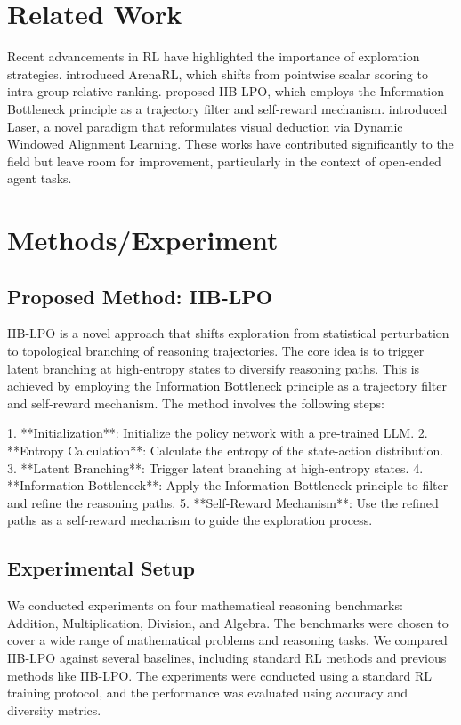 \documentclass{article}
\begin{document}
\section{Related Work}
Recent advancements in RL have highlighted the importance of exploration strategies. \cite{zhang2026arenarlscalingrlopenended} introduced ArenaRL, which shifts from pointwise scalar scoring to intra-group relative ranking. \cite{deng2026iiblpolatentpolicyoptimization} proposed IIB-LPO, which employs the Information Bottleneck principle as a trajectory filter and self-reward mechanism. \cite{wang2026foresttreeslatentsuperposition} introduced Laser, a novel paradigm that reformulates visual deduction via Dynamic Windowed Alignment Learning. These works have contributed significantly to the field but leave room for improvement, particularly in the context of open-ended agent tasks.

\section{Methods/Experiment}
\subsection{Proposed Method: IIB-LPO}
IIB-LPO is a novel approach that shifts exploration from statistical perturbation to topological branching of reasoning trajectories. The core idea is to trigger latent branching at high-entropy states to diversify reasoning paths. This is achieved by employing the Information Bottleneck principle as a trajectory filter and self-reward mechanism. The method involves the following steps:

1. **Initialization**: Initialize the policy network with a pre-trained LLM.
2. **Entropy Calculation**: Calculate the entropy of the state-action distribution.
3. **Latent Branching**: Trigger latent branching at high-entropy states.
4. **Information Bottleneck**: Apply the Information Bottleneck principle to filter and refine the reasoning paths.
5. **Self-Reward Mechanism**: Use the refined paths as a self-reward mechanism to guide the exploration process.

\subsection{Experimental Setup}
We conducted experiments on four mathematical reasoning benchmarks: Addition, Multiplication, Division, and Algebra. The benchmarks were chosen to cover a wide range of mathematical problems and reasoning tasks. We compared IIB-LPO against several baselines, including standard RL methods and previous methods like IIB-LPO. The experiments were conducted using a standard RL training protocol, and the performance was evaluated using accuracy and diversity metrics.
\end{document}
